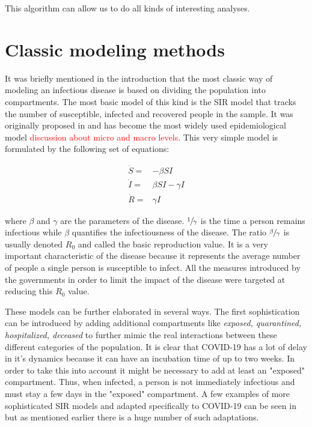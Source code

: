 \documentclass[12pt, letterpaper]{article}
\newcommand{\com}[1] {{\small {\fontfamily{ptm} \selectfont \textcolor{red}{#1}}}}
\begin{document}
This algorithm can allow us to do all kinds of interesting analyses. 

\section{Classic modeling methods}\label{sec:class}

It was briefly mentioned in the introduction that the most classic way of modeling an infectious disease is based on dividing the population into compartments. The most basic model of this kind is the SIR model that tracks the number of susceptible, infected and recovered people in the sample. It was originally proposed in \cite{sir} and has become the most widely used epidemiological model \com{discussion about micro and macro levels}. This very simple model is formulated by the following set of equations:

\begin{align*}
\dot{S} = &- \beta SI \\
\dot{I} = &\beta SI - \gamma I \\
\dot{R} = & \gamma I
\end{align*}

where $\beta$ and $\gamma$ are the parameters of the disease. $\sfrac{1}{\gamma}$ is the time a person remains infectious while $\beta$ quantifies the infectiousness of the disease. The ratio $\sfrac{\beta}{\gamma}$ is usually denoted $R_0$ and called the basic reproduction value. It is a very important characteristic of the disease because it represents the average number of people a single person is susceptible to infect. All the measures introduced by the governments in order to limit the impact of the disease were targeted at reducing this $R_0$ value. 

These models can be further elaborated in several ways. The first sophistication can be introduced by adding additional compartments like {\em exposed, quarantined, hospitalized, deceased} to further mimic the real interactions between these different categories of the population. It is clear that COVID-19 has a lot of delay in it's dynamics \cite{delay} because it can have an incubation time of up to two weeks. 
In order to take this into account it might be necessary to add at least an "exposed" compartment. Thus, when infected, a person is not immediately infectious and must stay a few days in the "exposed" compartment. 
A few examples of more sophisticated SIR models and adapted specifically to COVID-19 can be seen in \cite{seir} but as mentioned earlier there is a huge number of such adaptations.
\end{document}
